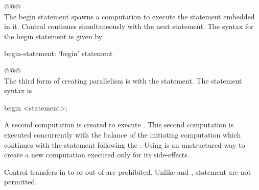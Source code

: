\noindent @@@\hrulefill \\
The begin statement spawns a computation to execute the statement
embedded in it.  Control continues simultaneously with the next
statement.  The syntax for the begin statement is given by
\begin{syntax}
begin-statement:
  `begin' statement
\end{syntax}
\noindent @@@\hrulefill \\

The third form of creating parallelism is with the 
statement. The  statement syntax is
\begin{chapel}
begin <statement>;
\end{chapel}
A second computation is created to execute .
This second computation is executed concurrently with the balance of
the initiating computation which continues with the statement
following the . Using  is an unstructured way to 
create a new computation executed only for its side-effects.

Control transfers in to or out of  are prohibited. Unlike
 and ,  statement are not permitted.

